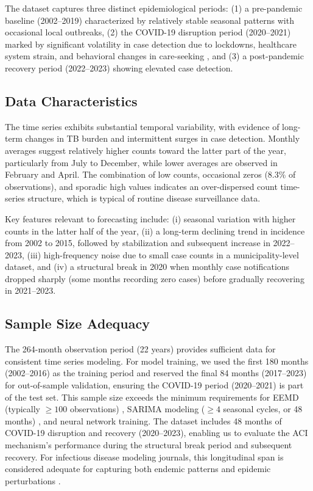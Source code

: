 \documentclass[final,3p,times,twocolumn,authoryear]{elsarticle}
\begin{document}
The dataset captures three distinct epidemiological periods: (1) a pre-pandemic baseline (2002--2019) characterized by relatively stable seasonal patterns with occasional local outbreaks, (2) the COVID-19 disruption period (2020--2021) marked by significant volatility in case detection due to lockdowns, healthcare system strain, and behavioral changes in care-seeking \citep{mcquaid2021potential}, and (3) a post-pandemic recovery period (2022--2023) showing elevated case detection.

\subsection{Data Characteristics}
The time series exhibits substantial temporal variability, with evidence of long-term changes in TB burden and intermittent surges in case detection. Monthly averages suggest relatively higher counts toward the latter part of the year, particularly from July to December, while lower averages are observed in February and April. The combination of low counts, occasional zeros (8.3\% of observations), and sporadic high values indicates an over-dispersed count time-series structure, which is typical of routine disease surveillance data.

Key features relevant to forecasting include: (i) seasonal variation with higher counts in the latter half of the year, (ii) a long-term declining trend in incidence from 2002 to 2015, followed by stabilization and subsequent increase in 2022--2023, (iii) high-frequency noise due to small case counts in a municipality-level dataset, and (iv) a structural break in 2020 when monthly case notifications dropped sharply (some months recording zero cases) before gradually recovering in 2021--2023.

\subsection{Sample Size Adequacy}
The 264-month observation period (22 years) provides sufficient data for consistent time series modeling. For model training, we used the first 180 months (2002--2016) as the training period and reserved the final 84 months (2017--2023) for out-of-sample validation, ensuring the COVID-19 period (2020--2021) is part of the test set. This sample size exceeds the minimum requirements for EEMD (typically $\geq 100$ observations) \citep{wu2009ensemble}, SARIMA modeling ($\geq 4$ seasonal cycles, or 48 months) \citep{box2015time}, and neural network training. The dataset includes 48 months of COVID-19 disruption and recovery (2020--2023), enabling us to evaluate the ACI mechanism's performance during the structural break period and subsequent recovery. For infectious disease modeling journals, this longitudinal span is considered adequate for capturing both endemic patterns and epidemic perturbations \citep{hyndman2018forecasting}.
\end{document}
